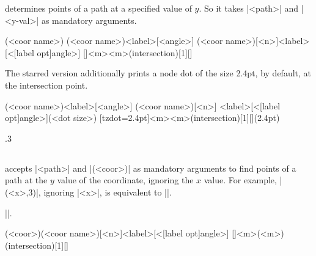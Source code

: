 \icmd{\tzhXpointat} determines  points of a path at a specified value of $y$.
So it takes |{<path>}| and |{<y-val>}| as mandatory arguments.

\begin{tzdef}{}
(<coor name>)
(<coor name>){<label>}[<angle>]
(<coor name>)[<n>]{<label>}[<[label opt]angle>]
  []{<m>}{<m>}(intersection)[1]{}[]
\end{tzdef}


The starred version \icmd{\tzhXpointat*} additionally prints a node dot of the size 2.4pt, by default, at the intersection point.

\begin{tzdef}{}
(<coor name>){<label>}[<angle>]
(<coor name>)[<n>]
             {<label>}[<[label opt]angle>](<dot size>)
  [tzdot=2.4pt]{<m>}{<m>}(intersection)[1]{}[](2.4pt)
\end{tzdef}

\begin{tzcode}{.3}
\end{tzcode}

\subsection{\protect\cmd{\tzhXpoint(*)}}
\label{ss:tzhXpoint}

\icmd{\tzhXpoint} accepts |{<path>}| and |(<coor>)| as mandatory arguments to find  points of a path at the $y$ value of the coordinate, ignoring the $x$ value.
For example, |(<x>,3)|, ignoring |<x>|, is equivalent to ||.

 |\tzhXpointat|.

\begin{tzdef}{}
(<coor>)(<coor name>)[<n>]{<label>}[<[label opt]angle>]
  []{<m>}(<m>)(intersection)[1]{}[]
\end{tzdef}

